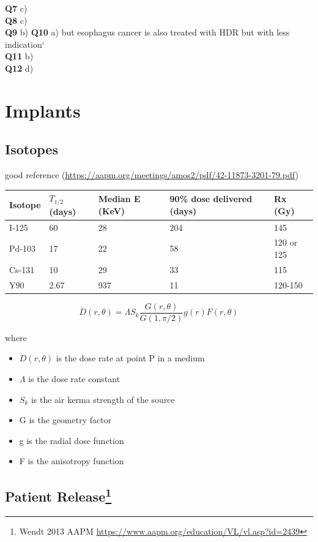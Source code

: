 \documentclass[]{book}
\providecommand{\tightlist}{%
  \setlength{\itemsep}{0pt}\setlength{\parskip}{0pt}}
\let\rmarkdownfootnote\footnote%
\def\footnote{\protect\rmarkdownfootnote}
\theoremstyle{definition}
\theoremstyle{definition}
\theoremstyle{definition}
\theoremstyle{remark}
\begin{document}
\textbf{Q7} c)\\
\textbf{Q8} c)\\
\textbf{Q9} b) \textbf{Q10} a) but esophagus cancer is also treated with
HDR but with less indication`\\
\textbf{Q11} b)\\
\textbf{Q12} d)

\chapter{Implants}\label{implants}

\section{Isotopes}\label{isotopes-1}

good reference
(\url{https://aapm.org/meetings/amos2/pdf/42-11873-3201-79.pdf})

\begin{longtable}[]{@{}lllll@{}}
\toprule
Isotope & \(T_{1/2}\) (days) & Median E (KeV) & 90\% dose delivered
(days) & Rx (Gy)\tabularnewline
\midrule
\endhead
I-125 & 60 & 28 & 204 & 145\tabularnewline
Pd-103 & 17 & 22 & 58 & 120 or 125\tabularnewline
Cs-131 & 10 & 29 & 33 & 115\tabularnewline
Y90 & 2.67 & 937 & 11 & 120-150\tabularnewline
\bottomrule
\end{longtable}

\begin{equation}
  \dot D(r, \theta) = \Lambda S_k \frac{G(r,\theta)}{G(1,\pi/2)} g(r) F(r,\theta)
\end{equation}

where

\begin{itemize}
\tightlist
\item
  \(\dot D(r,\theta)\) is the dose rate at point P in a medium
\item
  \(\Lambda\) is the dose rate constant
\item
  \(S_k\) is the air kerma strength of the source
\item
  G is the geometry factor
\item
  g is the radial dose function
\item
  F is the anisotropy function
\end{itemize}

\section[Patient Release]{\texorpdfstring{Patient Release\footnote{Wendt
  2013 AAPM \url{https://www.aapm.org/education/VL/vl.asp?id=2439}}}{Patient Release}}\label{patient-release}
\end{document}
